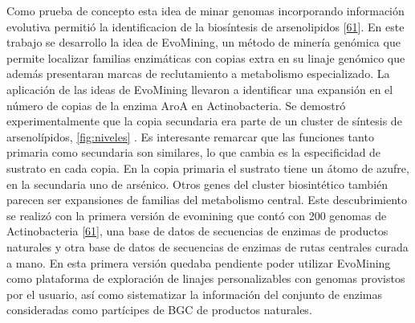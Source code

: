 \documentclass[12pt,twoside]{reedthesis}
\begin{document}
  Como prueba de concepto esta idea de minar genomas incorporando
  información evolutiva permitió la identificacion de la biosíntesis de
  arsenolipidos
  {[}\protect\hyperlink{ref-cruz-morales_phylogenomic_2016}{61}{]}. En
  este trabajo se desarrollo la idea de EvoMining, un método de minería
  genómica que permite localizar familias enzimáticas con copias extra en
  su linaje genómico que además presentaran marcas de reclutamiento a
  metabolismo especializado. La aplicación de las ideas de EvoMining
  llevaron a identificar una expansión en el número de copias de la enzima
  AroA en Actinobacteria. Se demostró experimentalmente que la copia
  secundaria era parte de un cluster de síntesis de arsenolípidos,
  \autoref{fig:niveles} . Es interesante remarcar que las funciones tanto
  primaria como secundaria son similares, lo que cambia es la
  especificidad de sustrato en cada copia. En la copia primaria el
  sustrato tiene un átomo de azufre, en la secundaria uno de arsénico.
  Otros genes del cluster biosintético también parecen ser expansiones de
  familias del metabolismo central. Este descubrimiento se realizó con la
  primera versión de evomining que contó con 200 genomas de Actinobacteria
  {[}\protect\hyperlink{ref-cruz-morales_phylogenomic_2016}{61}{]}, una
  base de datos de secuencias de enzimas de productos naturales y otra
  base de datos de secuencias de enzimas de rutas centrales curada a mano.
  En esta primera versión quedaba pendiente poder utilizar EvoMining como
  plataforma de exploración de linajes personalizables con genomas
  provistos por el usuario, así como sistematizar la información del
  conjunto de enzimas consideradas como partícipes de BGC de productos
  naturales.
  
\end{document}
